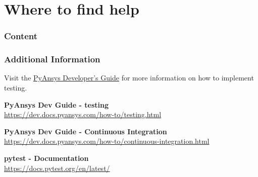 \documentclass[t]{beamer}
\begin{document}
\section{Where to find help}

\begin{frame}
  \frametitle{Content}
  \tableofcontents[currentsection]
  \vspace{200pt}  %
\end{frame}

\begin{frame}[fragile=singleslide]
  \frametitle{Additional Information}

  Visit the \href{https://dev.docs.pyansys.com/}{PyAnsys Developer’s Guide} for
  more information on how to implement testing.

  \centering

  \vspace{1em}
  \textbf{PyAnsys Dev Guide - testing}
  \\\href{https://dev.docs.pyansys.com/how-to/testing.html}{https://dev.docs.pyansys.com/how-to/testing.html}

  \vspace{1em}
  \textbf{PyAnsys Dev Guide - Continuous Integration}
  \\\href{https://dev.docs.pyansys.com/how-to/continuous-integration.html}{https://dev.docs.pyansys.com/how-to/continuous-integration.html}

  \vspace{1em}
  \textbf{pytest - Documentation}
  \\\href{https://docs.pytest.org/en/latest/}{https://docs.pytest.org/en/latest/}

\end{frame}


\lastframe{}
\end{document}
